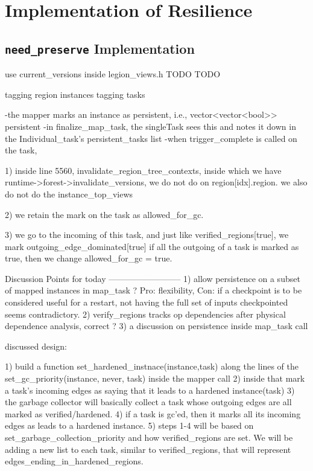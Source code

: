 \section{Implementation of Resilience}

\subsection{\texttt{need\_preserve} Implementation}

use current_versions inside legion_views.h TODO TODO

tagging region instances
tagging tasks

-the mapper marks an instance as persistent, i.e., vector<vector<bool>> persistent
-in finalize\_map\_task, the singleTask sees this and notes it down in the Individual\_task's persistent\_tasks list
-when trigger\_complete is called on the task, 

	1) inside line 5560, invalidate\_region\_tree\_contexts, 
		inside which we have runtime->forest->invalidate\_versions, we do not do on region[idx].region.
		we also do not do the instance\_top\_views
		
	2) we retain the mark on the task as allowed\_for\_gc.

   3) we go to the incoming of this task, and just like verified\_regions[true], we mark outgoing\_edge\_dominated[true]
      if all the outgoing of a task is marked as true, then we change allowed\_for\_gc = true.


Discussion Points for today
--------------------------
1) allow persistence on a subset of mapped instances in map\_task ? Pro:
flexibility, Con: if a checkpoint is to be considered useful for a restart, not
having the full set of inputs checkpointed seems contradictory. 
2) verify\_regions tracks op dependencies after physical dependence analysis, correct ? 
3) a discussion on persistence inside map\_task call 


discussed design:

1) build a function set\_hardened\_instnace(instance,task) along the lines of the set\_gc\_priority(instance, never, task) inside the mapper call
2) inside that mark a task's incoming edges as saying that it leads to a hardened instance(task)
3) the garbage collector will basically collect a task whose outgoing edges are all marked as verified/hardened.
4) if a task is gc'ed, then it marks all its incoming edges as leads to a hardened instance.
5) steps 1-4 will be based on set\_garbage\_collection\_priority and how verified\_regions are set. We will be adding a new list to each task, similar to verified\_regions, that will represent edges\_ending\_in\_hardened\_regions.


